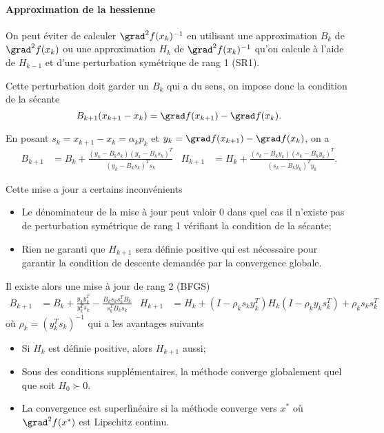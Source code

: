 \paragraph{Approximation de la hessienne}
On peut éviter de calculer $\grad^2 f(x_k)^{-1}$ en utilisant une
approximation $B_k$ de $\grad^2 f(x_k)$ ou une approximation
$H_k$ de $\grad^2 f(x_k)^{-1}$ qu'on calcule à l'aide de $H_{k-1}$
et d'une perturbation symétrique de rang 1 (SR1).

Cette perturbation doit garder un $B_k$ qui a du sens, on impose donc
la condition de la sécante
\[ B_{k+1}(x_{k+1}-x_k) = \grad f(x_{k+1}) - \grad f(x_k). \]

En posant $s_k = x_{k+1} - x_k = \alpha_k p_k$
et $y_k = \grad f(x_{k+1}) - \grad f(x_k)$, on a
\begin{align*}
  B_{k+1} & = B_k + \frac{(y_k-B_ks_k)(y_k-B_ks_k)^T}{(y_k-B_ks_k)^Ts_k} &
  H_{k+1} & = H_k + \frac{(s_k-B_ky_k)(s_k-B_ky_k)^T}{(s_k-B_ky_k)^Ty_k}.
\end{align*}

Cette mise a jour a certains inconvénients
\begin{itemize}
  \item Le dénominateur de la mise à jour peut valoir 0 dans
    quel cas il n'existe pas de perturbation symétrique de rang 1
    vérifiant la condition de la sécante;
  \item Rien ne garanti que $H_{k+1}$ sera définie positive qui est
    nécessaire pour garantir la condition de descente demandée par
    la convergence globale.
\end{itemize}

Il existe alors une mise à jour de rang 2 (BFGS)
\begin{align*}
  B_{k+1} & = B_k + \frac{y_ky_k^T}{y_k^Ts_k}-
  \frac{B_ks_ks_k^TB_k}{s_k^TB_ks_k} &
  H_{k+1} & = H_k + (I-\rho_ks_ky_k^T)H_k(I-\rho_ky_ks_k^T)+\rho_ks_ks_k^T
\end{align*}
où $\rho_k = (y_k^Ts_k)^{-1}$
qui a les avantages suivants
\begin{itemize}
  \item Si $H_k$ est définie positive, alors $H_{k+1}$ aussi;
  \item Sous des conditions supplémentaires,
    la méthode converge globalement quel que soit $H_0 \succ 0$.
  \item La convergence est superlinéaire si la méthode converge
    vers $x^*$ où $\grad^2 f(x^*)$ est Lipschitz continu.
\end{itemize}

